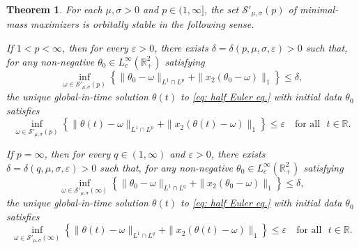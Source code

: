 \documentclass[11pt]{amsart}
\newtheorem{theorem}{Theorem}[section]
\theoremstyle{definition}
\theoremstyle{definition}
\numberwithin{equation}{section}
\newcommand{\0}{\emptyset}
\newcommand{\bbR}{\mathbb R}
\newcommand{\calS}{\mathcal S}
\begin{document}
           
            \begin{theorem}\label{thm_stability of patch}
            For each $\mu, \sigma > 0$ and $p \in (1, \infty]$, the set $\calS'_{\mu, \sigma}(p)$ of minimal-mass maximizers is orbitally stable in the following sense.
            \begin{itemize}[itemsep=0.8em]
            \item[(i)] If $1 < p < \infty$, then for every $\varepsilon > 0$, there exists $\delta = \delta(p, \mu, \sigma, \varepsilon) > 0$ such that, for any non-negative $\theta_0\in L^\infty_c(\bbR^2_+)$ satisfying
            \begin{equation}\label{eq_patch_assumption}
            \inf_{\omega\in\calS'_{\mu,\sigma}(p)} \left\{ \|\theta_0 - \omega\|_{L^1\cap L^p} + \|x_2(\theta_0-\omega)\|_1 \right\}\leq\delta,
            \end{equation}
            the unique global-in-time solution $\theta(t)$ to \eqref{eq: half Euler eq.} with initial data $\theta_0$ satisfies
            \begin{equation}\label{eq_patch_min}
            \inf_{\omega\in\calS'_{\mu,\sigma}(p)} \left\{ \|\theta(t)-\omega\|_{L^1\cap L^p} + \|x_2(\theta(t)-\omega)\|_1 \right\} \le \varepsilon \quad \mbox{for all }\,\, t\in\bbR.
            \end{equation}

             {\item[(ii)] If $p = \infty$, then for every $q \in (1,\infty)$ and $\varepsilon > 0$, there exists $\delta=\delta(q,\mu,\sigma,\varepsilon)>0$ such that, for any non-negative $\theta_0\in L^\infty_c(\bbR^2_+)$ satisfying
            \begin{equation}\label{eq_patch_assumption_infty}
            \inf_{\omega\in\calS'_{\mu,\sigma}(\infty)} \left\{ \|\theta_0-\omega\|_{L^1\cap L^q} + \|x_2(\theta_0-\omega)\|_1 \right\}\leq\delta,
            \end{equation}
            the unique global-in-time solution $\theta(t)$ to \eqref{eq: half Euler eq.} with initial data $\theta_0$ satisfies
            \begin{equation}\label{eq_patch_min_infty}
            \inf_{\omega\in\calS'_{\mu,\sigma}(\infty)} \left\{ \|\theta(t)-\omega\|_{L^1\cap L^q} + \|x_2(\theta(t)-\omega)\|_1 \right\} \le \varepsilon \quad\mbox{for all }\,\, t\in\bbR.
            \end{equation}}
            \end{itemize}
            \end{theorem}
        
\end{document}
